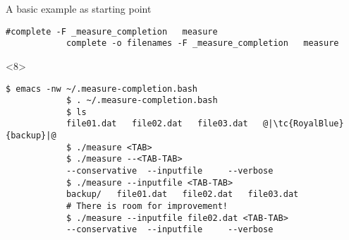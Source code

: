 \begin{frame}[fragile]{A basic example as starting point}
\begin{onlyenv}
\begin{lstlisting}[style=myBash, numbers=none, style=smaller]
            #complete -F _measure_completion   measure
            complete -o filenames -F _measure_completion   measure
        \end{lstlisting}
    \end{onlyenv}
    \begin{onlyenv}<8>
        \begin{lstlisting}[style=myBash, numbers=none, aboveskip=4mm]
            $ emacs -nw ~/.measure-completion.bash
            $ . ~/.measure-completion.bash
            $ ls
            file01.dat   file02.dat   file03.dat   @|\tc{RoyalBlue}{backup}|@
            $ ./measure <TAB>
            $ ./measure --<TAB-TAB>
            --conservative  --inputfile     --verbose
            $ ./measure --inputfile <TAB-TAB>
            backup/   file01.dat   file02.dat   file03.dat
            # There is room for improvement!
            $ ./measure --inputfile file02.dat <TAB-TAB>
            --conservative  --inputfile     --verbose
        \end{lstlisting}
    \end{onlyenv}
\end{frame}

